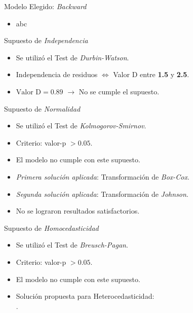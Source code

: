 \documentclass[11pt]{beamer}
\begin{document}
\begin{frame}{Modelo Elegido: \textit{Backward}}
	\begin{itemize}
		\item abc
	\end{itemize}
\end{frame}


\begin{frame}{Supuesto de \textit{Independencia}}
	\begin{itemize}
		\item Se utilizó el Test de \textit{Durbin-Watson}.
		\pause
		\item Independencia de residuos $\Leftrightarrow$ Valor D entre \textbf{1.5} y \textbf{2.5}. 
		\pause
		\item $\text{Valor D} = \mathbf{0.89}$ $\to$ No se cumple el supuesto.
	\end{itemize}
\end{frame}

\begin{frame}{Supuesto de \textit{Normalidad}}
	\begin{itemize}
		\item Se utilizó el Test de \textit{Kolmogorov-Smirnov}.
		\pause
		\item Criterio: valor-p $>\mathbf{0.05}$.
		\pause
		\item El modelo no cumple con este supuesto.
		\pause
		\item \textit{Primera solución aplicada}: Transformación de \textit{Box-Cox}.
		\pause
		\item \textit{Segunda solución aplicada}: Transformación de \textit{Johnson}.
		\pause
		\item No se lograron resultados satisfactorios.
	\end{itemize}
\end{frame}

\begin{frame}{Supuesto de \textit{Homocedasticidad}}
	\begin{itemize}
		\item Se utilizó el Test de \textit{Breusch-Pagan}.
		\pause
		\item Criterio: valor-p $>\mathbf{0.05}$.
		\pause
		\item El modelo no cumple con este supuesto.
		\pause
		\item Solución propuesta para Heterocedasticidad: \\ .
	\end{itemize}
\end{frame}
\end{document}
